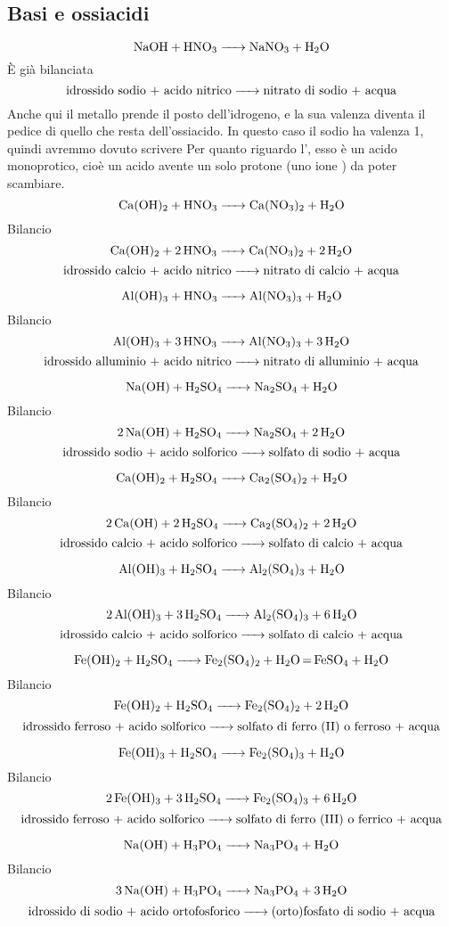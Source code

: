 \subsection{Basi e ossiacidi}

$$\ce{NaOH + HNO_3 -> NaNO_3 + H_2O}$$
È già bilanciata
$$\text{idrossido sodio + acido nitrico} \ce{->} \text{nitrato di sodio + acqua}$$
Anche qui il metallo prende il posto dell'idrogeno, e la sua valenza diventa il pedice di quello che resta dell'ossiacido. In questo caso il sodio ha valenza 1, quindi avremmo dovuto scrivere 
Per quanto riguardo l', esso è un acido monoprotico, cioè un acido avente un solo protone (uno ione ) da poter scambiare.
$$\ce{Ca(OH)_2 + HNO_3 -> Ca(NO_3)_2 + H_2O}$$Bilancio
$$\ce{Ca(OH)_2 + 2 HNO_3 -> Ca(NO_3)_2 + 2 H_2O}$$
$$\text{idrossido calcio + acido nitrico} \ce{->} \text{nitrato di calcio + acqua}$$

$$\ce{Al(OH)_3 + HNO_3 -> Al(NO_3)_3 + H_2O}$$Bilancio
$$\ce{Al(OH)_3 + 3 HNO_3 -> Al(NO_3)_3 + 3 H_2O}$$
$$\text{idrossido alluminio + acido nitrico} \ce{->} \text{nitrato di alluminio + acqua}$$

$$\ce{Na(OH) + H_2SO_4 -> Na_2SO_4 + H_2O}$$Bilancio
$$\ce{2 Na(OH) + H_2SO_4 -> Na_2SO_4 + 2 H_2O}$$
$$\text{idrossido sodio + acido solforico} \ce{->} \text{solfato di sodio + acqua}$$

$$\ce{Ca(OH)_2 + H_2SO_4 -> Ca_2(SO_4)_2 + H_2O}$$Bilancio
$$\ce{2 Ca(OH) + 2H_2SO_4 -> Ca_2(SO_4)_2 +  2 H_2O}$$
$$\text{idrossido calcio + acido solforico} \ce{->} \text{solfato di calcio + acqua}$$

$$\ce{Al(OH)_3 + H_2SO_4 -> Al_2(SO_4)_3 + H_2O}$$Bilancio
$$\ce{2 Al(OH)_3 + 3H_2SO_4 -> Al_2(SO_4)_3 + 6 H_2O}$$
$$\text{idrossido calcio + acido solforico} \ce{->} \text{solfato di calcio + acqua}$$

$$\ce{Fe(OH)_2 + H_2SO_4 -> Fe_2(SO_4)_2 + H_2O \text{=} FeSO_4 + H_2O}$$Bilancio
$$\ce{Fe(OH)_2 + H_2SO_4 -> Fe_2(SO_4)_2 + 2 H_2O}$$
$$\text{idrossido ferroso + acido solforico} \ce{->} \text{solfato di ferro (II) o ferroso + acqua}$$

$$\ce{Fe(OH)_3 + H_2SO_4 -> Fe_2(SO_4)_3 + H_2O}$$Bilancio
$$\ce{2 Fe(OH)_3 + 3H_2SO_4 -> Fe_2(SO_4)_3 + 6 H_2O}$$
$$\text{idrossido ferroso + acido solforico} \ce{->} \text{solfato di ferro (III) o ferrico + acqua}$$

$$\ce{Na(OH) + H_3PO_4 -> Na_3PO_4 + H_2O}$$Bilancio
$$\ce{3 Na(OH) + H_3PO_4 -> Na_3PO_4 + 3 H_2O}$$
$$\text{idrossido di sodio + acido ortofosforico} \ce{->} \text{(orto)fosfato di sodio + acqua}$$


